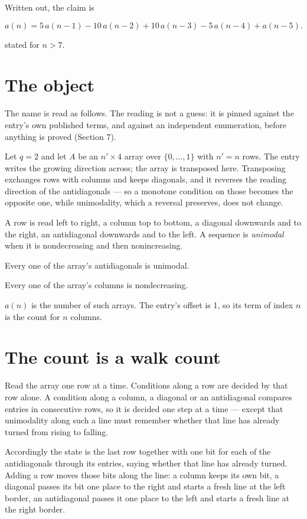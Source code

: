 \documentclass[11pt]{article}
\theoremstyle{definition}
\begin{document}
Written out, the claim is

\[a(n) = 5\,a(n-1) - 10\,a(n-2) + 10\,a(n-3) - 5\,a(n-4) + a(n-5).\]

stated for $n > 7$.

\section{The object}

The name is read as follows. The reading is not a guess: it is pinned against the entry's own published terms, and against an independent enumeration, before anything is proved (Section 7).

Let $q = 2$ and let $A$ be an $n' \times 4$ array over $\{0,\dots,1\}$ with $n' = n$ rows. The entry writes the growing direction across; the array is transposed here. Transposing exchanges rows with columns and keeps diagonals, and it reverses the reading direction of the antidiagonals --- so a monotone condition on those becomes the opposite one, while unimodality, which a reversal preserves, does not change.

A row is read left to right, a column top to bottom, a diagonal downwards and to the right, an antidiagonal downwards and to the left. A sequence is {\itshape unimodal} when it is nondecreasing and then nonincreasing.

Every one of the array's antidiagonals is unimodal.

Every one of the array's columns is nondecreasing.

$a(n)$ is the number of such arrays. The entry's offset is 1, so its term of index $n$ is the count for $n$ columns.

\section{The count is a walk count}

Read the array one row at a time. Conditions along a row are decided by that row alone. A condition along a column, a diagonal or an antidiagonal compares entries in consecutive rows, so it is decided one step at a time --- except that unimodality along such a line must remember whether that line has already turned from rising to falling.

Accordingly the state is the last row together with one bit for each of the antidiagonals through its entries, saying whether that line has already turned. Adding a row moves those bits along the line: a column keeps its own bit, a diagonal passes its bit one place to the right and starts a fresh line at the left border, an antidiagonal passes it one place to the left and starts a fresh line at the right border.
\end{document}
